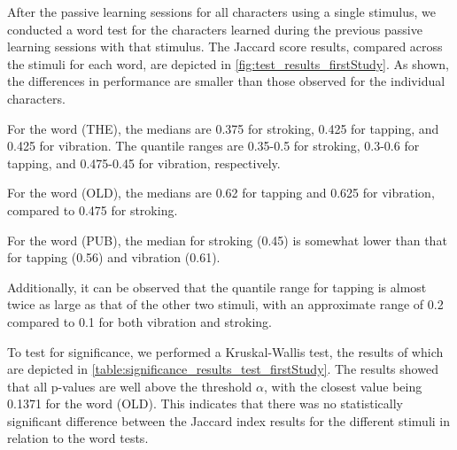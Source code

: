 After the passive learning sessions for all characters using a single stimulus, we conducted a word test for the characters learned during the previous passive learning sessions with that stimulus. 
The Jaccard score results, compared across the stimuli for each word, are depicted in \autoref{fig:test_results_firstStudy}. 
As shown, the differences in performance are smaller than those observed for the individual characters. 

For the word (THE), the medians are 0.375 for stroking, 0.425 for tapping, and 0.425 for vibration. The quantile ranges are 0.35-0.5 for stroking, 0.3-0.6 for tapping, and 0.475-0.45 for vibration, respectively.

For the word (OLD), the medians are 0.62 for tapping and 0.625 for vibration, compared to 0.475 for stroking.

For the word (PUB), the median for stroking (0.45) is somewhat lower than that for tapping (0.56) and vibration (0.61). 

Additionally, it can be observed that the quantile range for tapping is almost twice as large as that of the other two stimuli, with an approximate range of 0.2 compared to 0.1 for both vibration and stroking.

To test for significance, we performed a Kruskal-Wallis test, the results of which are depicted in \autoref{table:significance_results_test_firstStudy}. 
The results showed that all p-values are well above the threshold $\alpha$, with the closest value being 0.1371 for the word (OLD). 
This indicates that there was no statistically significant difference between the Jaccard index results for the different stimuli in relation to the word tests.

\begin{table}[ht]
\caption{Results of the Kruskal-Wallis significance tests for the wordtests \enquote{THE}, \enquote{OLD}, and \enquote{PUB} with a $\eta^2$ Effect Size.}
\label{table:significance_results_test_firstStudy}
\end{table}



